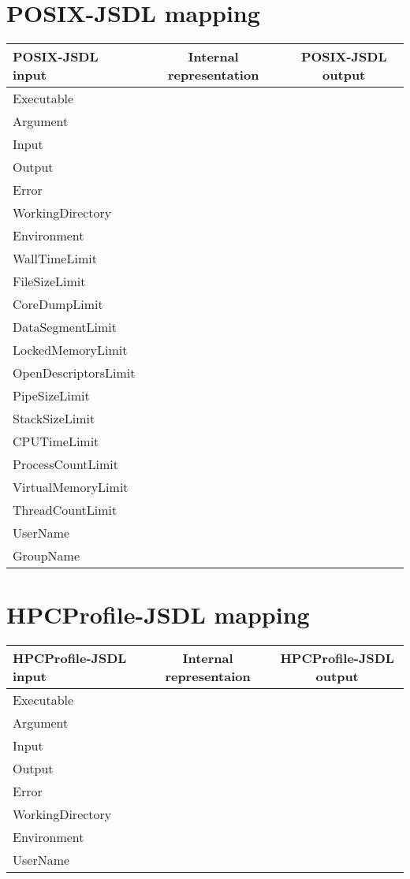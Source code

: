 \documentclass{article}
\begin{document}
\section{POSIX-JSDL mapping}
\begin{table}
\begin{center}
\begin{tabular}{l|c|c}
POSIX-JSDL input  & Internal representation & POSIX-JSDL output\\\hline
Executable & &\\
Argument & &\\
Input & &\\
Output & &\\
Error & &\\
WorkingDirectory & &\\
Environment & &\\
WallTimeLimit & &\\
FileSizeLimit & &\\
CoreDumpLimit & &\\
DataSegmentLimit & &\\
LockedMemoryLimit & &\\
OpenDescriptorsLimit & &\\
PipeSizeLimit & &\\
StackSizeLimit & &\\
CPUTimeLimit & &\\
ProcessCountLimit & &\\
VirtualMemoryLimit & &\\
ThreadCountLimit & &\\
UserName & &\\
GroupName & &\\
\end{tabular}
\end{center}
\end{table}

\section{HPCProfile-JSDL mapping}
\begin{table}
\begin{center}
\begin{tabular}{l|c|c}
HPCProfile-JSDL input  & Internal representaion & HPCProfile-JSDL output\\\hline
Executable & & \\
Argument & & \\
Input & & \\
Output & & \\
Error & & \\
WorkingDirectory & &\\
Environment & &\\
UserName & &\\
\end{tabular}
\end{center}
\end{table}
\end{document}
